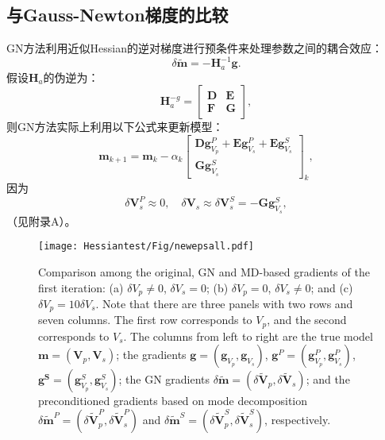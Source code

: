 \subsection{与Gauss-Newton梯度的比较}
GN方法利用近似Hessian的逆对梯度进行预条件来处理参数之间的耦合效应：
\begin{equation}
\delta\tilde{\mathbf{m}} = - \mathbf{H}^{-1}_a\mathbf{g}.
\label{eq:GN}
\end{equation}
假设$\mathbf{H}_a$的伪逆为：
\begin{equation}
        \mathbf{H}^{-g}_a=    
        \begin{bmatrix}
                \mathbf{D}&\mathbf{E} \\
                \mathbf{F}&\mathbf{G}
        \end{bmatrix},
        \label{eq:HessInv}
\end{equation}
则GN方法实际上利用以下公式来更新模型：
\begin{equation}
    \mathbf{{m}}_{k+1}
    =\mathbf{{m}}_{k}-\alpha_k 
    \begin{bmatrix}
        \mathbf{D}\mathbf{g}^P_{V_p} +
        \mathbf{E}\mathbf{g}^P_{V_s}+
        \mathbf{E}\mathbf{g}^S_{V_s}\\
        \mathbf{G}\mathbf{g}^S_{V_s}
    \end{bmatrix}_{k},
    \label{eq:PreGNFi}
\end{equation}
因为
\begin{equation}
        \delta \mathbf{V}^P_s\approx0, \quad \delta \mathbf{V}_s \approx \delta
        \mathbf{V}^S_s=-\mathbf{G}\mathbf{g}^S_{V_s},
        \label{eq:KeyPoint}
\end{equation}
（见附录A）。
\begin{figure*}
    \begin{center}
        \texttt{[image: Hessiantest/Fig/newepsall.pdf]}
        \caption{
    Comparison among the original, GN and MD-based gradients
        of the first iteration:
    (a) $\delta V_p \neq 0$, $\delta V_s=0$; (b) $\delta V_p=0$, $\delta V_s\neq0$; and (c)
    $\delta V_p=10 \delta V_s$.
        Note that there are three panels with two rows and seven columns.
        The first row corresponds to $V_p$, and the second
                corresponds to $V_s$.
    The columns from left to right are the true model $\mathbf{m}=(\mathbf{V}_p,
    \mathbf{V}_s)$;
    the gradients $\mathbf{g}=(\mathbf{g}_{V_p},\mathbf{g}_{V_s})$,
    $\mathbf{g}^P=(\mathbf{g}^P_{V_p},\mathbf{g}^P_{V_s})$,
    $\mathbf{g^S}=(\mathbf{g}^S_{V_p},\mathbf{g}^S_{V_s})$;
    the GN gradients $\delta
    \mathbf{\tilde{m}}=(\delta\mathbf{\tilde{V}}_p,\delta\mathbf{\tilde{V}}_s)$;
        and the preconditioned gradients based on mode decomposition $\delta
        \mathbf{\tilde{m}}^P=(\delta\mathbf{\tilde{V}}^P_p,\delta\mathbf{\tilde{V}}^P_s)$
        and $\delta
        \mathbf{\tilde{m}}^S=(\delta\mathbf{\tilde{V}}^S_p,\delta\mathbf{\tilde{V}}^S_s)$, respectively.
    }
    \label{fig:all}
    \end{center}
\end{figure*}

